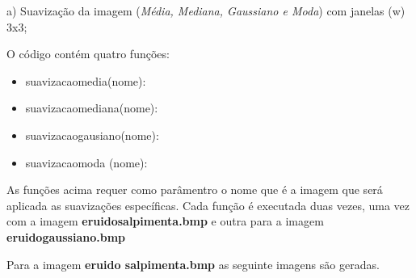 \documentclass[10pt,a4paper]{article}
\begin{document}
\begin{flushleft}
a) Suavização da imagem (\textit {Média, Mediana, Gaussiano e Moda}) com janelas (w) 3x3;
\end{flushleft}

\begin{flushleft}
O código contém quatro funções:
\end{flushleft}

\begin{itemize}
    \item {\ttfamily suavizacao\textunderscore media(nome):}
    \item {\ttfamily suavizacao\textunderscore mediana(nome):}
    \item {\ttfamily suavizacao\textunderscore gausiano(nome):}
    \item {\ttfamily suavizacao\textunderscore moda (nome):}
\end{itemize}

\begin{flushleft}
As funções acima requer como parâmentro o nome que é a imagem que será aplicada as suavizações específicas. Cada função é executada duas vezes, uma vez com a imagem \textbf{e\textunderscore ruido\textunderscore salpimenta.bmp} e outra para a imagem \textbf{e\textunderscore ruido\textunderscore gaussiano.bmp}
\end{flushleft}

\begin{flushleft}
Para a imagem \textbf{e\textunderscore ruido \textunderscore salpimenta.bmp} as seguinte imagens são geradas.
\end{flushleft}
\end{document}

